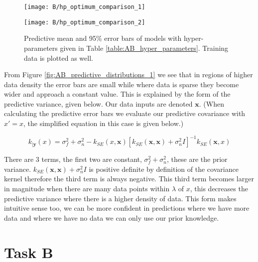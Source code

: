 \documentclass[11pt]{article}
\begin{document}
\begin{figure}[h]
    \centering
    \begin{minipage}{0.5\textwidth}
        \centering
        \texttt{[image: B/hp\_optimum\_comparison\_1]} 
        \label{fig:AB_predictive_distributions_1}
    \end{minipage}%
    \begin{minipage}{0.5\textwidth}
        \centering
        \texttt{[image: B/hp\_optimum\_comparison\_2]} 
        \label{fig:AB_predictive_distributions_2}
    \end{minipage}
    \caption{Predictive mean and 95\% error bars of models with hyper-parameters given in Table \ref{table:AB_hyper_parameters}. Training data is plotted as well.}
    \label{fig:AB_predictive_distributions}
\end{figure}

From Figure \ref{fig:AB_predictive_distributions_1} we see that in regions of higher data density the error bars are small while where data is sparse they become wider and approach a constant value. This is explained by the form of the predictive variance, given below. Our data inputs are denoted $\textbf{x}$. (When calculating the predictive error bars we evaluate our predictive covariance with $x' = x$, the simplified equation in this case is given below.)

\[k_{|\textbf{y}}(x) = \sigma_f^2 + \sigma_n^2 - k_{SE}(x, \textbf{x})[k_{SE}(\textbf{x}, \textbf{x}) + \sigma_n^2 I]^{-1} k_{SE}(\textbf{x}, x)\]

There are 3 terms, the first two are constant, $\sigma_f^2 + \sigma_n^2$, these are the prior variance. $k_{SE}(\textbf{x}, \textbf{x}) + \sigma_n^2 I$ is positive definite by definition of the covariance kernel therefore the third term is always negative. This third term becomes larger in magnitude when there are many data points within $\lambda$ of $x$, this decreases the predictive variance where there is a higher density of data. This form makes intuitive sense too, we can be more confident in predictions where we have more data and where we have no data we can only use our prior knowledge.

\section{Task B}
\end{document}
